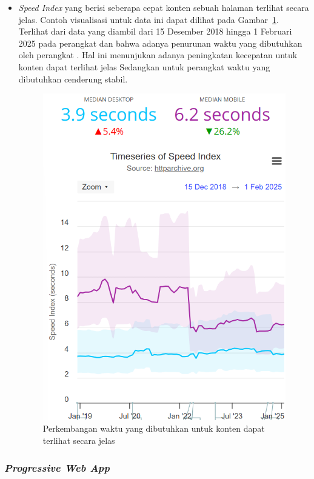 \begin{itemize}
    \item \textit{Speed Index} yang berisi seberapa cepat konten sebuah halaman terlihat secara jelas.  Contoh visualisasi untuk data ini dapat dilihat pada Gambar~\ref{fig:speedindex}. Terlihat dari data yang diambil dari 15 Desember 2018 hingga 1 Februari 2025 pada perangkat \desktop dan \mobile bahwa adanya penurunan waktu yang dibutuhkan oleh perangkat \mobile. Hal ini menunjukan adanya peningkatan kecepatan untuk konten dapat terlihat jelas Sedangkan untuk perangkat \desktop waktu yang dibutuhkan cenderung stabil.
    \begin{figure}[H]
        \centering
        \includegraphics[width=0.4\linewidth]{Gambar/Contoh Speed Index.png}
        \caption{Perkembangan waktu yang dibutuhkan untuk konten dapat terlihat secara jelas}
        \label{fig:speedindex}
    \end{figure}
    
\end{itemize}

\subsubsection{\textit{Progressive Web App}}
\label{subsub:pwa}

